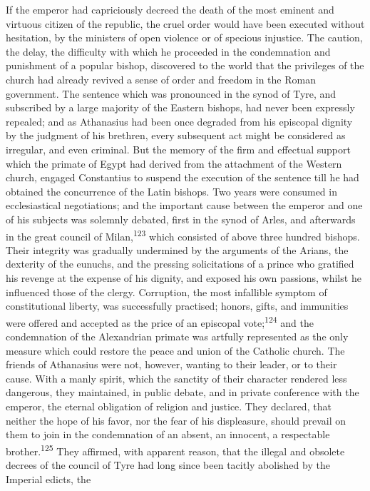If the emperor had capriciously decreed the death of the most
eminent and virtuous citizen of the republic, the cruel order
would have been executed without hesitation, by the ministers of
open violence or of specious injustice. The caution, the delay,
the difficulty with which he proceeded in the condemnation and
punishment of a popular bishop, discovered to the world that the
privileges of the church had already revived a sense of order and
freedom in the Roman government. The sentence which was
pronounced in the synod of Tyre, and subscribed by a large
majority of the Eastern bishops, had never been expressly
repealed; and as Athanasius had been once degraded from his
episcopal dignity by the judgment of his brethren, every
subsequent act might be considered as irregular, and even
criminal. But the memory of the firm and effectual support which
the primate of Egypt had derived from the attachment of the
Western church, engaged Constantius to suspend the execution of
the sentence till he had obtained the concurrence of the Latin
bishops. Two years were consumed in ecclesiastical negotiations;
and the important cause between the emperor and one of his
subjects was solemnly debated, first in the synod of Arles, and
afterwards in the great council of Milan,\textsuperscript{123} which consisted of
above three hundred bishops. Their integrity was gradually
undermined by the arguments of the Arians, the dexterity of the
eunuchs, and the pressing solicitations of a prince who gratified
his revenge at the expense of his dignity, and exposed his own
passions, whilst he influenced those of the clergy. Corruption,
the most infallible symptom of constitutional liberty, was
successfully practised; honors, gifts, and immunities were
offered and accepted as the price of an episcopal vote;\textsuperscript{124} and
the condemnation of the Alexandrian primate was artfully
represented as the only measure which could restore the peace and
union of the Catholic church. The friends of Athanasius were not,
however, wanting to their leader, or to their cause. With a manly
spirit, which the sanctity of their character rendered less
dangerous, they maintained, in public debate, and in private
conference with the emperor, the eternal obligation of religion
and justice. They declared, that neither the hope of his favor,
nor the fear of his displeasure, should prevail on them to join
in the condemnation of an absent, an innocent, a respectable
brother.\textsuperscript{125} They affirmed, with apparent reason, that the
illegal and obsolete decrees of the council of Tyre had long
since been tacitly abolished by the Imperial edicts, the
